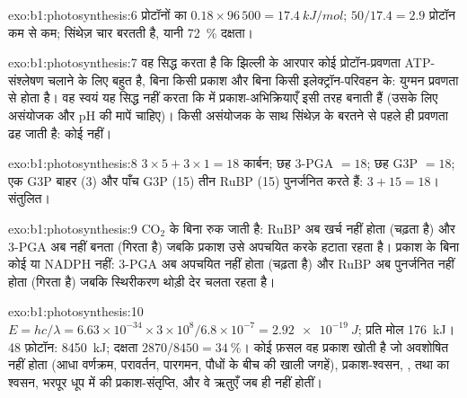 \begin{solution}{exo:b1:photosynthesis:6}
प्रोटॉनों का $0.18\times 96\,500 = \qty{17.4}{kJ/mol}$; $50/17.4 = 2.9$
प्रोटॉन कम से कम; सिंथेज़ चार बरतती है, यानी \qty{72}{\%}
दक्षता।
\end{solution}

\begin{solution}{exo:b1:photosynthesis:7}
वह सिद्ध करता है कि  झिल्ली के आरपार कोई प्रोटॉन-प्रवणता
ATP-संश्लेषण चलाने के लिए बहुत है, बिना किसी प्रकाश और बिना किसी
इलेक्ट्रॉन-परिवहन के: युग्मन प्रवणता से होता है। वह स्वयं यह सिद्ध नहीं
करता कि  में प्रकाश-अभिक्रियाएँ  इसी तरह बनाती हैं (उसके लिए
असंयोजक और pH की मापें चाहिए)। किसी असंयोजक के साथ सिंथेज़ के बरतने से
पहले ही प्रवणता ढह जाती है: कोई  नहीं।
\end{solution}

\begin{solution}{exo:b1:photosynthesis:8}
$3\times 5 + 3\times 1 = 18$ कार्बन; छह 3-PGA $= 18$; छह G3P $= 18$;
एक G3P बाहर (3) और पाँच G3P (15) तीन RuBP (15) पुनर्जनित करते हैं: $3 +
15 = 18$। संतुलित।
\end{solution}

\begin{solution}{exo:b1:photosynthesis:9}
$\mathrm{CO_2}$ के बिना  रुक जाती है: RuBP अब खर्च नहीं होता
(चढ़ता है) और 3-PGA अब नहीं बनता (गिरता है) जबकि प्रकाश उसे
अपचयित करके हटाता रहता है। प्रकाश के बिना कोई  या NADPH नहीं: 3-PGA अब
अपचयित नहीं होता (चढ़ता है) और RuBP अब पुनर्जनित नहीं होता (गिरता है)
जबकि स्थिरीकरण थोड़ी देर चलता रहता है।
\end{solution}

\begin{solution}{exo:b1:photosynthesis:10}
$E = hc/\lambda = 6.63\times 10^{-34}\times 3\times 10^8/6.8\times
10^{-7} = \qty{2.92e-19}{J}$; प्रति मोल \qty{176}{kJ}। 48 फ़ोटॉन:
\qty{8450}{kJ}; दक्षता $2870/8450 = \qty{34}{\%}$। कोई फ़सल वह
प्रकाश खोती है जो अवशोषित नहीं होता (आधा वर्णक्रम, परावर्तन, पारगमन,
पौधों के बीच की खाली जगहें), प्रकाश-श्वसन, ,  तथा  का
श्वसन, भरपूर धूप में  की प्रकाश-संतृप्ति, और वे ऋतुएँ जब 
ही नहीं होतीं।
\end{solution}

